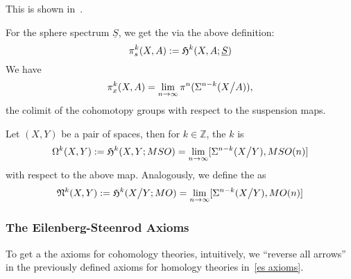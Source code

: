 \documentclass[a4paper,12pt]{article}
\begin{document}
This is shown in\ \cite{whitehead}.

\begin{example}\label{stable cohomotopy groups}
    For the sphere spectrum \(\underline{S}\), we get the  via the above definition:
    \[\pi_s^k(X,A):=\mathfrak{H}^k(X,A;\underline{S})\]
    We have
    \[\pi_x^k(X,A)=\lim_{n\to\infty}\pi^n(\Sigma^{n-k}(X\big/A)),\]
    the colimit of the cohomotopy groups with respect to the suspension maps.
\end{example}

\begin{definition}
    Let \((X,Y)\) be a pair of spaces, then for \(k\in\mathbb{Z}\), the \(k\) is
    \[\Omega^k(X,Y):=\mathfrak{H}^k(X,Y;MSO)=\lim_{n\to\infty}[\Sigma^{n-k}(X\big/Y),MSO(n)]\]
    with respect to the above map.
    Analogously, we define the  as
    \[\mathfrak{N}^k(X,Y):= \mathfrak{H}^k(X\big/Y;MO)=\lim_{n\to\infty}[\Sigma^{n-k}(X\big/ Y),MO(n)]\]
\end{definition}



\subsubsection{The Eilenberg-Steenrod Axioms}
To get a the axioms for cohomology theories, intuitively, we \enquote{reverse all arrows} in the previously defined axioms for homology theories in\ \ref{es axioms}.
\end{document}
